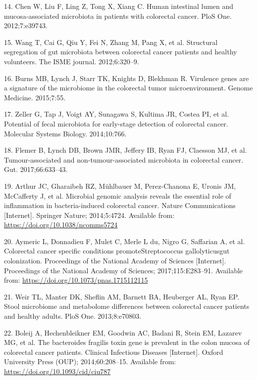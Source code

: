 \documentclass[12pt,]{article}
\begin{document}
\hypertarget{ref-chen_human_2012}{}
14. Chen W, Liu F, Ling Z, Tong X, Xiang C. Human intestinal lumen and
mucosa-associated microbiota in patients with colorectal cancer. PloS
One. 2012;7:e39743.

\hypertarget{ref-wang_structural_2012}{}
15. Wang T, Cai G, Qiu Y, Fei N, Zhang M, Pang X, et al. Structural
segregation of gut microbiota between colorectal cancer patients and
healthy volunteers. The ISME journal. 2012;6:320--9.

\hypertarget{ref-burns_virulence_2015}{}
16. Burns MB, Lynch J, Starr TK, Knights D, Blekhman R. Virulence genes
are a signature of the microbiome in the colorectal tumor
microenvironment. Genome Medicine. 2015;7:55.

\hypertarget{ref-zeller_potential_2014}{}
17. Zeller G, Tap J, Voigt AY, Sunagawa S, Kultima JR, Costea PI, et al.
Potential of fecal microbiota for early-stage detection of colorectal
cancer. Molecular Systems Biology. 2014;10:766.

\hypertarget{ref-flemer_tumour-associated_2017}{}
18. Flemer B, Lynch DB, Brown JMR, Jeffery IB, Ryan FJ, Claesson MJ, et
al. Tumour-associated and non-tumour-associated microbiota in colorectal
cancer. Gut. 2017;66:633--43.

\hypertarget{ref-ecoli_Arthur_2014}{}
19. Arthur JC, Gharaibeh RZ, Mühlbauer M, Perez-Chanona E, Uronis JM,
McCafferty J, et al. Microbial genomic analysis reveals the essential
role of inflammation in bacteria-induced colorectal cancer. Nature
Communications {[}Internet{]}. Springer Nature; 2014;5:4724. Available
from: \url{https://doi.org/10.1038/ncomms5724}

\hypertarget{ref-strep_Aymeric_2017}{}
20. Aymeric L, Donnadieu F, Mulet C, Merle L du, Nigro G, Saffarian A,
et al. Colorectal cancer specific conditions promoteStreptococcus
gallolyticusgut colonization. Proceedings of the National Academy of
Sciences {[}Internet{]}. Proceedings of the National Academy of
Sciences; 2017;115:E283--91. Available from:
\url{https://doi.org/10.1073/pnas.1715112115}

\hypertarget{ref-weir_stool_2013}{}
21. Weir TL, Manter DK, Sheflin AM, Barnett BA, Heuberger AL, Ryan EP.
Stool microbiome and metabolome differences between colorectal cancer
patients and healthy adults. PloS One. 2013;8:e70803.

\hypertarget{ref-bfrag_Boleij_2014}{}
22. Boleij A, Hechenbleikner EM, Goodwin AC, Badani R, Stein EM, Lazarev
MG, et al. The bacteroides fragilis toxin gene is prevalent in the colon
mucosa of colorectal cancer patients. Clinical Infectious Diseases
{[}Internet{]}. Oxford University Press (OUP); 2014;60:208--15.
Available from: \url{https://doi.org/10.1093/cid/ciu787}
\end{document}
